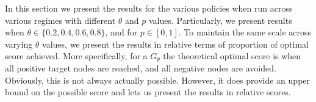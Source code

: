 In this section we present the results for the various policies when run across various regimes with different $\theta$ and $p$ values. Particularly, we present results when $\theta \in \{0.2, 0.4, 0.6, 0.8\}$, and for $p \in [0,1]$. To maintain the same scale across varying $\theta$ values, we present the results in relative terms of proportion of optimal score achieved. More specifically, for a $G_\theta$ the theoretical optimal score is when all positive target nodes are reached, and all negative nodes are avoided. Obviously, this is not always actually possible. However, it does provide an upper bound on the possible score and lets us present the results in relative scores.


